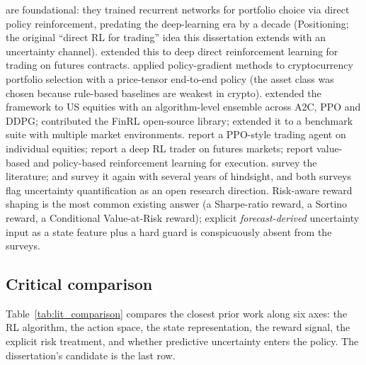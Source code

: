 \textcite{moody2001learning} are foundational: they trained recurrent networks for portfolio choice via direct policy reinforcement, predating the deep-learning era by a decade (Positioning; the original ``direct RL for trading'' idea this dissertation extends with an uncertainty channel). \textcite{deng2017deep} extended this to deep direct reinforcement learning for trading on futures contracts. \textcite{jiang2017deep} applied policy-gradient methods to cryptocurrency portfolio selection with a price-tensor end-to-end policy (the asset class was chosen because rule-based baselines are weakest in crypto). \textcite{yang2020deep} extended the framework to US equities with an algorithm-level ensemble across A2C, PPO and DDPG; \textcite{liu2021finrl} contributed the FinRL open-source library; \textcite{liu2022finrlmeta} extended it to a benchmark suite with multiple market environments. \textcite{theate2021application} report a PPO-style trading agent on individual equities; \textcite{zhang2020deep} report a deep RL trader on futures markets; \textcite{daberius2019deep} report value-based and policy-based reinforcement learning for execution. \textcite{pricope2021drl} survey the literature; \textcite{sun2023reinforcement} and \textcite{hambly2023recent} survey it again with several years of hindsight, and both surveys flag uncertainty quantification as an open research direction. Risk-aware reward shaping is the most common existing answer (a Sharpe-ratio reward, a Sortino reward, a Conditional Value-at-Risk reward); explicit \emph{forecast-derived} uncertainty input as a state feature plus a hard guard is conspicuously absent from the surveys.

\subsection{Critical comparison}
\label{sec:drl_for_finance_table}

Table~\ref{tab:lit_comparison} compares the closest prior work along six axes: the RL algorithm, the action space, the state representation, the reward signal, the explicit risk treatment, and whether predictive uncertainty enters the policy. The dissertation's candidate is the last row.

